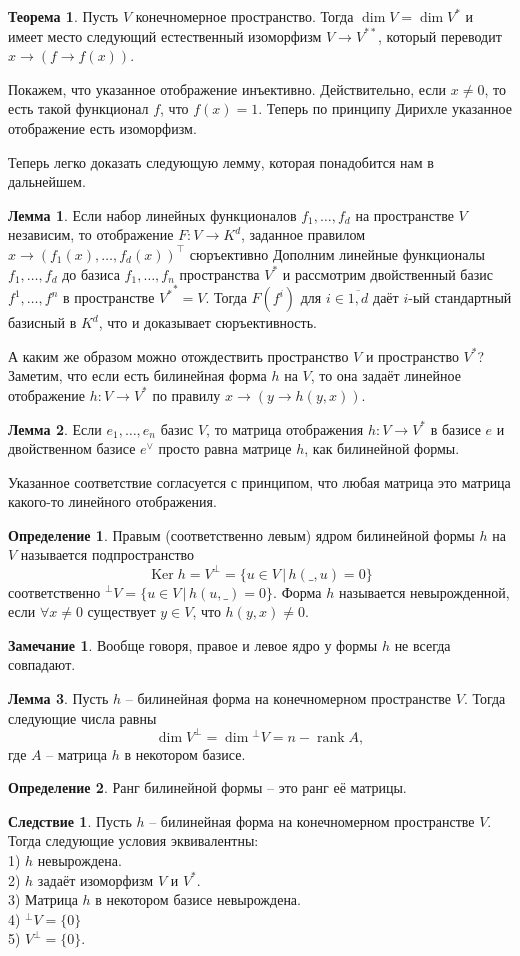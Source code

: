 \documentclass[10pt,a4paper,oneside]{book} %
\theoremstyle{definition}
\newtheorem*{rem}{Замечание}
\newtheorem*{defn}{Определение}
\newtheorem{thm}{Теорема}
\newtheorem{lem}{Лемма}
\newtheorem{cor}{Следствие}
\newcommand{\ovl}{\overline}
\newcommand{\rank}{\operatorname{rank}}
\DeclareMathOperator{\Ker}{Ker}
\def\thrm{\begin{thm}}
\def\ethrm{\end{thm}}
\def\dfn{\begin{defn}}
\def\edfn{\end{defn}}
\def\lm{\begin{lem}}
\def\elm{\end{lem}}
\def\crl{\begin{cor}}
\def\ecrl{\end{cor}}
\def\rm{\begin{rem}}
\def\erm{\end{rem}}
\begin{document}
\thrm Пусть $V$ конечномерное пространство. Тогда $\dim V = \dim V^{*} $ и имеет место следующий естественный изоморфизм $V \to V^{**} $, который переводит $x \to (f\to f(x))$.
\ethrm
\proof Покажем, что указанное отображение инъективно. Действительно, если $x\neq 0$, то есть такой функционал $f$, что $f(x)=1$. 
Теперь по принципу Дирихле указанное отображение есть изоморфизм.
\endproof


Теперь легко доказать следующую лемму, которая понадобится нам в дальнейшем.

\lm Если набор линейных функционалов $f_1,\dots,f_d$ на пространстве $V$  независим, то отображение $F\colon V\to K^d$, заданное правилом $x \to (f_1(x),\dots, f_d(x))^{\top}$ сюръективно
\proof Дополним линейные функционалы $f_1,\dots,f_d$ до базиса $f_1,\dots,f_n$ пространства $V^*$ и рассмотрим двойственный базис $f^1,\dots,f^n$ в пространстве ${V^*}^*=V$. Тогда $F(f^i)$ для $i\in\ovl{1,d}$ даёт $i$-ый стандартный базисный в $K^d$, что и доказывает сюръективность.
\endproof
\elm


А каким же образом можно отождествить пространство $V$ и пространство $V^*$?
Заметим, что если есть билинейная форма $h$ на $V$, то она задаёт линейное отображение $h\colon V \to V^*$ по правилу $x \to (y \to h(y,x))$. 

\lm Если $e_1,\dots, e_n$ базис $V$, то матрица отображения $h\colon V \to V^*$ в базисе $e$ и двойственном базисе $e^{\vee}$ просто равна матрице $h$, как билинейной формы.
\elm

Указанное соответствие согласуется с принципом, что любая матрица это матрица какого-то линейного отображения.


\dfn Правым (соответственно левым) ядром билинейной формы $h$ на $V$ называется подпространство $$\Ker h= V^{\bot}=\{u \in V\,| \,h(\_,u)=0\}$$
соответственно ${}^{\bot}V=\{u \in V\,| \, h(u,\_)=0\}$. Форма $h$ называется невырожденной, если $\forall x \neq 0$ существует $y \in V$, что $h(y,x)\neq 0$.
\edfn


\rm Вообще говоря, правое и левое ядро у формы $h$ не всегда совпадают.
\erm

\lm Пусть $h$ -- билинейная форма  на конечномерном пространстве $V$. Тогда следующие числа равны 
$$\dim V^{\bot}= \dim {}^{\bot}V=n -\rank A,$$
где $A$ -- матрица $h$ в некотором базисе.
\elm

\dfn Ранг билинейной формы -- это ранг её матрицы.
\edfn

\crl Пусть $h$ -- билинейная форма  на конечномерном пространстве $V$. Тогда следующие условия эквивалентны:\\
1) $h$ невырождена.\\
2) $h$ задаёт изоморфизм $V$ и $V^*$.\\
3) Матрица $h$ в некотором базисе невырождена.\\
4) ${}^{\bot} V =\{0\}$\\
5) $V^{\bot}=\{0\}$.
\ecrl
\end{document}
